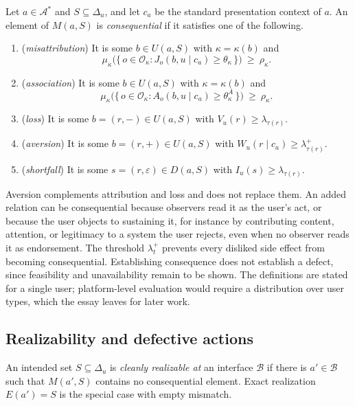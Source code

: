 \begin{definition}
Let $a\in\mathcal{A}^{*}$ and $S\subseteq\Delta_u$, and let $c_a$ be the standard presentation context of $a$. An element of $M(a,S)$ is \emph{consequential} if it satisfies one of the following.
\begin{enumerate}
  \item (\emph{misattribution}) It is some $b\in U(a,S)$ with $\kappa=\kappa(b)$ and
  \[
  \mu_\kappa\bigl(\{\,o\in\mathcal{O}_\kappa : J_o(b,u\mid c_a)\ge\theta_\kappa\,\}\bigr)\ \ge\ \rho_\kappa .
  \]
  \item (\emph{association}) It is some $b\in U(a,S)$ with $\kappa=\kappa(b)$ and
  \[
  \mu_\kappa\bigl(\{\,o\in\mathcal{O}_\kappa : A_o(b,u\mid c_a)\ge\theta^{A}_\kappa\,\}\bigr)\ \ge\ \rho_\kappa .
  \]
  \item (\emph{loss}) It is some $b=(r,-)\in U(a,S)$ with $V_u(r)\ge\lambda_{\tau(r)}$.
  \item (\emph{aversion}) It is some $b=(r,+)\in U(a,S)$ with $W_u(r\mid c_a)\ge\lambda^{+}_{\tau(r)}$.
  \item (\emph{shortfall}) It is some $s=(r,\varepsilon)\in D(a,S)$ with $I_u(s)\ge\lambda_{\tau(r)}$.
\end{enumerate}
\end{definition}

\begin{remark}
Aversion complements attribution and loss and does not replace them. An added relation can be consequential because observers read it as the user's act, or because the user objects to sustaining it, for instance by contributing content, attention, or legitimacy to a system the user rejects, even when no observer reads it as endorsement. The threshold $\lambda^{+}_t$ prevents every disliked side effect from becoming consequential. Establishing consequence does not establish a defect, since feasibility and unavailability remain to be shown. The definitions are stated for a single user; platform-level evaluation would require a distribution over user types, which the essay leaves for later work.
\end{remark}

\subsection{Realizability and defective actions}

\begin{definition}
An intended set $S\subseteq\Delta_u$ is \emph{cleanly realizable at} an interface $\mathcal{B}$ if there is $a'\in\mathcal{B}$ such that $M(a',S)$ contains no consequential element. Exact realization $E(a')=S$ is the special case with empty mismatch.
\end{definition}

